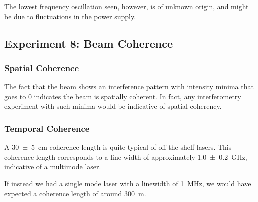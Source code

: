 \documentclass[a4paper]{scrartcl}
\begin{document}
The lowest frequency oscillation seen, however, is of unknown origin, and might be due to fluctuations in the power supply.

\subsection{Experiment 8: Beam Coherence}
\subsubsection{Spatial Coherence}
The fact that the beam shows an interference pattern with intensity minima that goes to 0 indicates the beam is spatially coherent. In fact, any interferometry experiment with such minima would be indicative of spatial coherency.

\subsubsection{Temporal Coherence}
A \SI{30 \pm 5}{\centi\metre} coherence length is quite typical of off-the-shelf lasers. This coherence length corresponds to a line width of approximately \SI{1.0 \pm 0.2}{\giga\hertz}, indicative of a multimode laser.

If instead we had a single mode laser with a linewidth of \SI{1}{\mega\hertz}, we would have expected a coherence length of around \SI{300}{\metre}.
\end{document}
